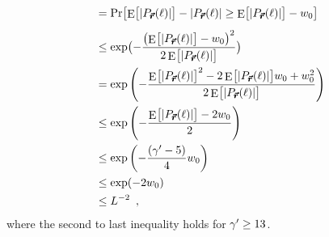 \documentclass{theoretics}
\DeclareMathOperator{\Expop}{E}
\newcommand{\Prob}[2][]{\Pr_{#1} \bigl[ #2 \bigr]}
\newcommand{\Expectation}[2][]{\Expop_{#1} \bigl[ #2 \bigr]}
\newcommand{\setsize}[1]{\lvert#1\rvert}
\newcommand{\eqcomma}{\enspace ,}
\newcommand{\cgammap}{\ensuremath \gamma'}
\newcommand{\indexvec}{\ell}
\newcommand{\nvecs}{L}
\newcommand{\vecr}{\vec{r}}
\newcommand{\vecrb}{\pmb{\vecr}}
\newcommand{\goodset}[2][\vecrb]{P_{#1}(#2)}
\numberwithin{equation}{section}
\begin{document}
{\begin{enumerate}
\begin{subequations}
\begin{align}
  &=
  \Prob{ \Expectation{ \setsize{ \goodset{\indexvec} } } - \setsize{ \goodset{\indexvec} }
   \ge \Expectation{ \setsize{ \goodset{\indexvec} } } - w_0  }\\
  &\le
  \exp
  \bigl( - 
  \frac{\bigl(\Expectation{ \setsize{ \goodset{\indexvec} } } - w_0 \bigr)^2}{2 \Expectation{ \setsize{ \goodset{\indexvec} } } }
  \bigr)\\  
  &=
  \exp 
  \left( - 
  \frac{\Expectation{ \setsize{ \goodset{\indexvec} } }^2 - 2\Expectation{ \setsize{ \goodset{\indexvec} } } w_0 + w_0^2}{2 \Expectation{ \setsize{ \goodset{\indexvec} } } }
  \right)\\
  &\le
  \exp
  \left( - 
  \frac{\Expectation{ \setsize{ \goodset{\indexvec} } } - 2 w_0}{ 2 }
  \right)\\
  &\le
  \exp
  \left( - 
  \frac{ (\cgammap - 5)}{ 4 } w_0
  \right)\\
  &\le
  \exp( -2 w_0 )\\
  &\le
  \nvecs^{-2} \eqcomma
\end{align}
\end{subequations}
where the second to last inequality holds for $\cgammap\geq 13$. 


\end{enumerate}}
\end{document}
